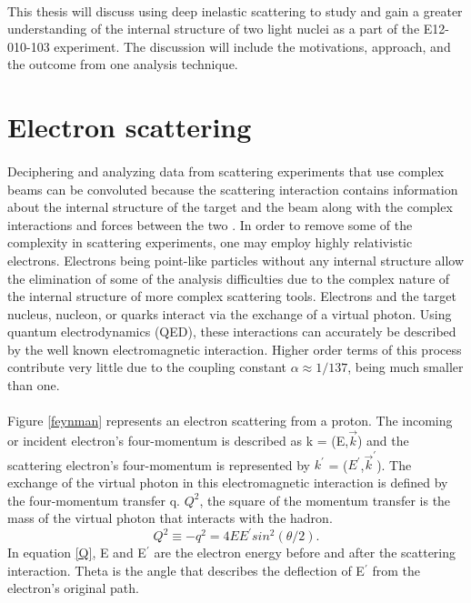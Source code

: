 \paragraph{}This thesis will discuss using deep inelastic scattering to study and gain a greater understanding of the internal structure of two light nuclei as a part of the E12-010-103 experiment. The discussion will include the motivations, approach, and the outcome from one analysis technique.
\section{Electron scattering}\label{sec:escat}
\paragraph{}Deciphering and analyzing data from scattering experiments that use complex beams can be convoluted because the scattering interaction contains information about the internal structure of the target and the beam along with the complex interactions and forces between the two \cite{PnN}.  In order to remove some of the complexity in scattering experiments, one may employ highly relativistic electrons. Electrons being point-like particles without any internal structure allow the elimination of some of the analysis difficulties due to the complex nature of the internal structure of more complex scattering tools. Electrons and the target nucleus, nucleon, or quarks interact via the exchange of a virtual photon. Using quantum electrodynamics (QED), these interactions can accurately be described by the well known electromagnetic interaction. Higher order terms of this process contribute very little due to the coupling constant $\alpha \approx 1/137 $, being much smaller than one. 
\paragraph{} Figure \ref{feynman} represents an electron scattering from a proton. The incoming or incident electron's four-momentum is described as k = (E,$ \vec{k}$) and the scattering electron's four-momentum is represented by $k^\prime{}$ = ($E^\prime{}$,$\vec{k}^\prime{}$). The exchange of the virtual photon in this electromagnetic interaction is defined by the four-momentum transfer q. $Q^2$, the square of the momentum transfer is the mass of the virtual photon that interacts with the hadron. 
\begin{equation}
\label{Q}
Q^2 \equiv -q^2 = 4EE^\prime{} sin^2(\theta/2).
\end{equation} 
In equation \ref{Q}, E and E$^\prime$ are the electron energy before and after the scattering interaction. Theta is the angle that describes the deflection of E$^\prime$ from the electron's original path. 

